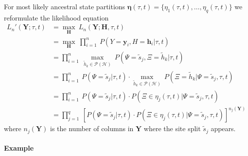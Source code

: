 \documentclass[a4paper]{article}
\newcommand{\fullAlignment}{\mathbf{Y}}
\newcommand{\alignmentColumn}{\mathbf{y}}
\newcommand{\alignmentColumnRV}{Y}
\newcommand{\siteSplit}{\tilde{s}}
\newcommand{\fullAncestralStates}{\mathbf{H}}
\newcommand{\ancestralStateColumn}{\mathbf{h}}
\newcommand{\ancestralStateColumnRV}{H}
\newcommand{\ancestralSplit}{\tilde{h}}
\newcommand{\ancestralSplitSet}{\mathcal{H}}
\newcommand{\ancestralSplitPartition}{\eta}
\newcommand{\fullAncestralSplitPartitions}{\boldsymbol\eta}
\newcommand{\siteSplitRV}{\Psi}
\newcommand{\ancestralSplitRV}{\Xi}
\newcommand{\nCols}{n}
\newcommand{\nSiteSplits}{q}
\begin{document}
For most likely ancestral state partitions $\fullAncestralSplitPartitions(\tau, t)=\{\ancestralSplitPartition_1(\tau, t),\ldots,\ancestralSplitPartition_\nSiteSplits(\tau, t)\}$ we reformulate the likelihood equation
\begin{align}
L_\nCols'(\fullAlignment;\tau, t) &= \max_{\fullAncestralStates} \ L_\nCols(\fullAlignment;\fullAncestralStates, \tau, t) \\
                             &= \max_{\fullAncestralStates} \ \prod_{i=1}^{\nCols} \ P(\alignmentColumnRV=\alignmentColumn_i, \ancestralStateColumnRV=\ancestralStateColumn_i | \tau, t) \\
                             &= \prod_{i=1}^{\nCols} \ \max_{\ancestralSplit_k\in\mathcal{P}(\ancestralSplitSet)} \ P(\siteSplitRV=\siteSplit_j, \ancestralSplitRV=\ancestralSplit_k | \tau, t) \\
                             &= \prod_{i=1}^{\nCols} \ P(\siteSplitRV=\siteSplit_j| \tau, t)\cdot\max_{\ancestralSplit_k\in\mathcal{P}(\ancestralSplitSet)} \ P(\ancestralSplitRV=\ancestralSplit_k |\siteSplitRV=\siteSplit_j, \tau, t) \\
                             &= \prod_{i=1}^{\nCols} \ P(\siteSplitRV=\siteSplit_j | \tau, t)\cdot P(\ancestralSplitRV\in\ancestralSplitPartition_j(\tau, t) | \siteSplitRV=\siteSplit_j, \tau, t) \\
                             &= \prod_{j=1}^{\nSiteSplits} \ \left[P(\siteSplitRV=\siteSplit_j | \tau, t)\cdot P(\ancestralSplitRV\in\ancestralSplitPartition_j(\tau, t) | \siteSplitRV=\siteSplit_j, \tau, t)\right] ^{\nCols_j(\fullAlignment)} \label{eq:site_pattern_likelihood}
\end{align}
where $\nCols_j(\fullAlignment)$ is the number of columns in $\fullAlignment$ where the site split $\siteSplit_j$ appears.

\paragraph{Example}
\end{document}
